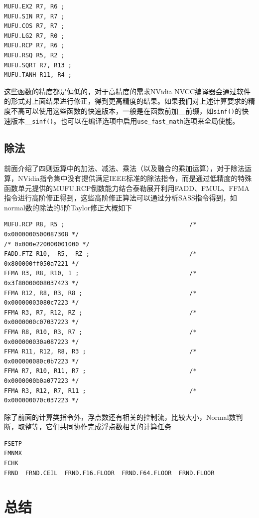 \begin{lstlisting}
MUFU.EX2 R7, R6 ;
MUFU.SIN R7, R7 ;
MUFU.COS R7, R7 ;
MUFU.LG2 R7, R0 ;
MUFU.RCP R7, R6 ;
MUFU.RSQ R5, R2 ;
MUFU.SQRT R7, R13 ;
MUFU.TANH R11, R4 ;
\end{lstlisting}

这些函数的精度都是偏低的，对于高精度的需求NVidia NVCC编译器会通过软件的形式对上面结果进行修正，得到更高精度的结果。如果我们对上述计算要求的精度不高可以使用这些函数的快速版本，一般是在函数前加\lstinline|__|前缀，如\lstinline|sinf()|的快速版本\lstinline|__sinf()|。也可以在编译选项中启用\lstinline|use_fast_math|选项来全局使能。

\subsection{除法}

前面介绍了四则运算中的加法、减法、乘法（以及融合的乘加运算），对于除法运算，NVidia指令集中没有提供满足IEEE标准的除法指令，而是通过低精度的特殊函数单元提供的MUFU.RCP倒数能力结合泰勒展开利用FADD、FMUL、FFMA指令进行高阶修正得到，这些高阶修正算法可以通过分析SASS指令得到，如normal数的除法的5阶Taylor修正大概如下

\begin{lstlisting}
MUFU.RCP R8, R5 ;                                   /* 0x0000000500087308 */                                                                                      /* 0x000e220000001000 */
FADD.FTZ R10, -R5, -RZ ;                            /* 0x800000ff050a7221 */
FFMA R3, R8, R10, 1 ;                               /* 0x3f80000008037423 */
FFMA R12, R8, R3, R8 ;                              /* 0x00000003080c7223 */
FFMA R3, R7, R12, RZ ;                              /* 0x0000000c07037223 */
FFMA R8, R10, R3, R7 ;                              /* 0x000000030a087223 */
FFMA R11, R12, R8, R3 ;                             /* 0x000000080c0b7223 */
FFMA R7, R10, R11, R7 ;                             /* 0x0000000b0a077223 */
FFMA R3, R12, R7, R11 ;                             /* 0x000000070c037223 */
\end{lstlisting}

除了前面的计算类指令外，浮点数还有相关的控制流，比较大小，Normal数判断，取整等，它们共同协作完成浮点数相关的计算任务

\begin{lstlisting}
FSETP
FMNMX
FCHK
FRND  FRND.CEIL  FRND.F16.FLOOR  FRND.F64.FLOOR  FRND.FLOOR
\end{lstlisting}

\section{总结}

